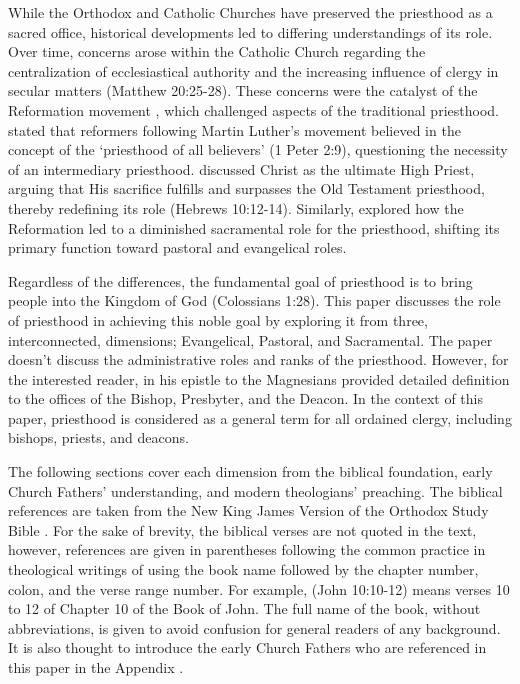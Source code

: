 \documentclass[12pt,doc]{apa7}   	%
\begin{document}
While the Orthodox and Catholic Churches have preserved the priesthood as a sacred office, historical developments led to differing understandings of its role. Over time, concerns arose within the Catholic Church regarding the centralization of ecclesiastical authority and the increasing influence of clergy in secular matters (Matthew 20:25-28). These concerns were the catalyst of the Reformation movement \citep{reformation_lutzer}, which challenged aspects of the traditional priesthood.  \citet{reformation_lull_nelson} stated that reformers following Martin Luther's movement believed in the concept of the ‘priesthood of all believers’ (1 Peter 2:9), questioning the necessity of an intermediary priesthood. \citet{hebrews_wright} discussed Christ as the ultimate High Priest, arguing that His sacrifice fulfills and surpasses the Old Testament priesthood, thereby redefining its role (Hebrews 10:12-14). Similarly, \citet{reformation_macCulloch} explored how the Reformation led to a diminished sacramental role for the priesthood, shifting its primary function toward pastoral and evangelical roles.

Regardless of the differences, the fundamental goal of priesthood is to bring people into the Kingdom of God (Colossians 1:28). This paper discusses the role of priesthood in achieving this noble goal by exploring it from three, interconnected, dimensions; Evangelical, Pastoral, and Sacramental.  The paper doesn't discuss the administrative roles and ranks of the priesthood.  However, for the interested reader, \citet{epistles_ignatius} in his epistle to the Magnesians provided detailed definition to the offices of the Bishop, Presbyter, and the Deacon.  In the context of this paper, priesthood is considered as a general term for all ordained clergy, including bishops, priests, and deacons.

The following sections cover each dimension from the biblical foundation, early Church Fathers' understanding, and modern theologians' preaching.  The biblical references are taken from the New King James Version of the Orthodox Study Bible \citep{nelson_nkjv}.  For the sake of brevity, the biblical verses are not quoted in the text, however, references are given in parentheses following the common practice in theological writings of using the book name followed by the chapter number, colon, and the verse range number.  For example, (John 10:10-12) means verses 10 to 12 of Chapter 10 of the Book of John.  The full name of the book, without abbreviations, is given to avoid confusion for general readers of any background.  It is also thought to introduce the early Church Fathers who are referenced in this paper in the Appendix \citep{early_church_akin}.
\end{document}
